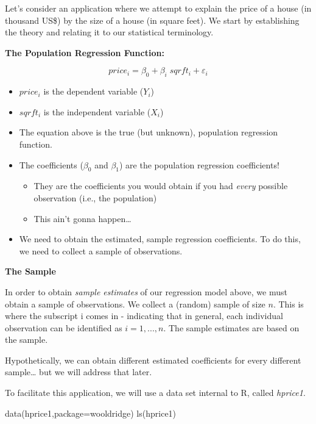 \documentclass[
]{book}
\newenvironment{Shaded}{\begin{snugshade}}{\end{snugshade}}
\newcommand{\AttributeTok}[1]{\textcolor[rgb]{0.77,0.63,0.00}{#1}}
\newcommand{\FunctionTok}[1]{\textcolor[rgb]{0.00,0.00,0.00}{#1}}
\newcommand{\NormalTok}[1]{#1}
\newcommand{\StringTok}[1]{\textcolor[rgb]{0.31,0.60,0.02}{#1}}
\begin{document}
Let's consider an application where we attempt to explain the price of a house (in thousand US\$) by the size of a house (in square feet). We start by establishing the theory and relating it to our statistical terminology.

\textbf{The Population Regression Function:}

\[price_i = \beta_0 + \beta_i \; sqrft_i + \varepsilon_i\]

\begin{itemize}
\item
  \(price_i\) is the dependent variable (\(Y_i\))
\item
  \(sqrft_i\) is the independent variable (\(X_i\))
\item
  The equation above is the true (but unknown), population regression function.
\item
  The coefficients (\(\beta_0\) and \(\beta_1\)) are the population regression coefficients!

  \begin{itemize}
  \item
    They are the coefficients you would obtain if you had \emph{every} possible observation (i.e., the population)
  \item
    This ain't gonna happen\ldots{}
  \end{itemize}
\item
  We need to obtain the estimated, sample regression coefficients. To do this, we need to collect a sample of observations.
\end{itemize}

\textbf{The Sample}

In order to obtain \emph{sample estimates} of our regression model above, we must obtain a sample of observations. We collect a (random) sample of size \(n\). This is where the subscript i comes in - indicating that in general, each individual observation can be identified as \(i=1,...,n\). The sample estimates are based on the sample.

Hypothetically, we can obtain different estimated coefficients for every different sample\ldots{} but we will address that later.

To facilitate this application, we will use a data set internal to R, called \emph{hprice1}.

\begin{Shaded}
\begin{Highlighting}[]
\FunctionTok{data}\NormalTok{(hprice1,}\AttributeTok{package=}\StringTok{\textquotesingle{}wooldridge\textquotesingle{}}\NormalTok{)}
\FunctionTok{ls}\NormalTok{(hprice1)}
\end{Highlighting}
\end{Shaded}
\end{document}
